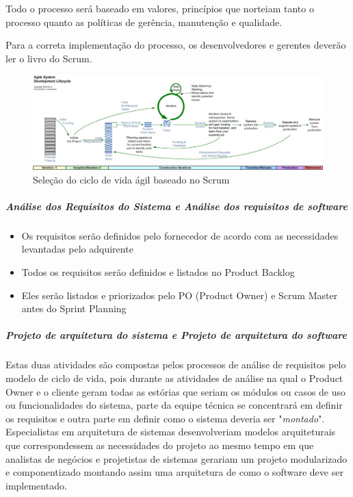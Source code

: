 Todo o processo será baseado em valores, princípios que norteiam tanto o processo quanto as políticas de gerência, manutenção e qualidade.

Para a correta implementação do processo, os desenvolvedores e gerentes deverão ler o livro do Scrum.

\begin{figure}[!h]
  \centering
  \includegraphics[width=1\textwidth]{softwareengineer/images/agileLifecycleDetailed} 
  \caption{Seleção do ciclo de vida ágil baseado no Scrum \cite{ambysoft:09}}
  \label{fig:scrumlifecycle} 
\end{figure}

\subparagraph{Análise dos Requisitos do Sistema e Análise dos requisitos de software}

\begin{itemize}
  \item Os requisitos serão definidos pelo fornecedor de acordo com as necessidades levantadas pelo adquirente

  \item Todos os requisitos serão definidos e listados no Product Backlog

  \item Eles serão listados e priorizados pelo PO (Product Owner) e Scrum Master antes do Sprint Planning
\end{itemize}

\subparagraph{Projeto de arquitetura do sistema e Projeto de arquitetura do software}

Estas duas atividades são compostas pelos processos de análise de requisitos pelo modelo de ciclo de vida, pois durante as atividades de análise na qual o Product Owner e o cliente geram todas as estórias que seriam os módulos ou casos de uso ou funcionalidades do sistema, parte da equipe técnica se concentrará em definir os requisitos e outra parte em definir como o sistema deveria ser "\textit{montado}". Especialistas em arquitetura de sistemas desenvolveriam modelos arquiteturais que correspondessem as necessidades do projeto ao mesmo tempo em que analistas de negócios e projetistas de sistemas gerariam um projeto modularizado e componentizado montando assim uma arquitetura de como o software deve ser implementado.

